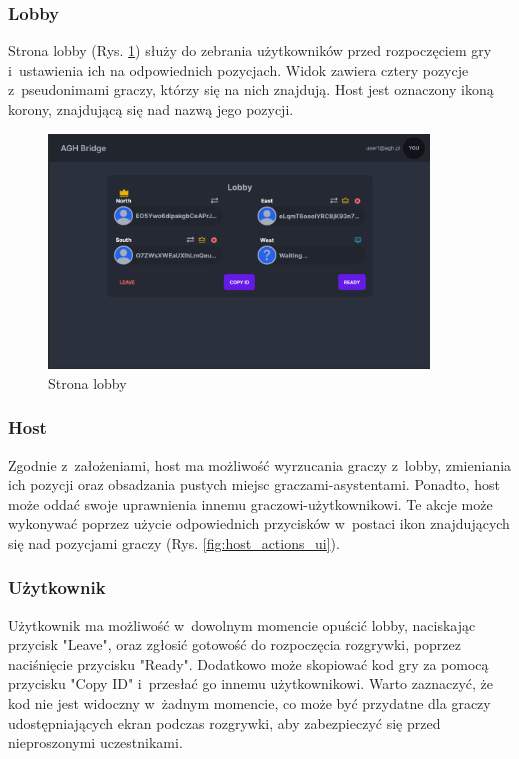 \FloatBarrier

\subsubsection{Lobby}

Strona lobby (Rys. \ref{fig:lobby}) służy do zebrania
użytkowników przed rozpoczęciem gry i~ustawienia ich
na odpowiednich pozycjach. Widok zawiera cztery pozycje
z~pseudonimami graczy, którzy się na nich znajdują.
Host jest oznaczony ikoną korony, znajdującą się nad nazwą
jego pozycji.

\begin{figure}[h!]
  \centering
  \includegraphics[width=0.9\textwidth]{img/widoki/lobby.png}
  \caption{Strona lobby}
  \label{fig:lobby}
\end{figure}

\FloatBarrier

\subsubsection{Host}

Zgodnie z~założeniami, host ma możliwość wyrzucania graczy
z~lobby, zmieniania ich pozycji oraz obsadzania pustych
miejsc graczami-asystentami. Ponadto, host może oddać swoje
uprawnienia innemu graczowi-użytkownikowi. Te akcje może
wykonywać poprzez użycie odpowiednich przycisków w~postaci
ikon znajdujących się nad pozycjami graczy (Rys. \ref{fig:host_actions_ui}).

\subsubsection{Użytkownik}

Użytkownik ma możliwość w~dowolnym momencie opuścić lobby, naciskając przycisk "Leave",
oraz zgłosić gotowość do rozpoczęcia rozgrywki, poprzez naciśnięcie przycisku "Ready".
Dodatkowo może skopiować kod gry za pomocą przycisku "Copy ID" i~przesłać go innemu
użytkownikowi. Warto zaznaczyć, że kod nie jest widoczny w~żadnym momencie, co może być
przydatne dla graczy udostępniających ekran podczas rozgrywki, aby zabezpieczyć się przed
nieproszonymi uczestnikami.

